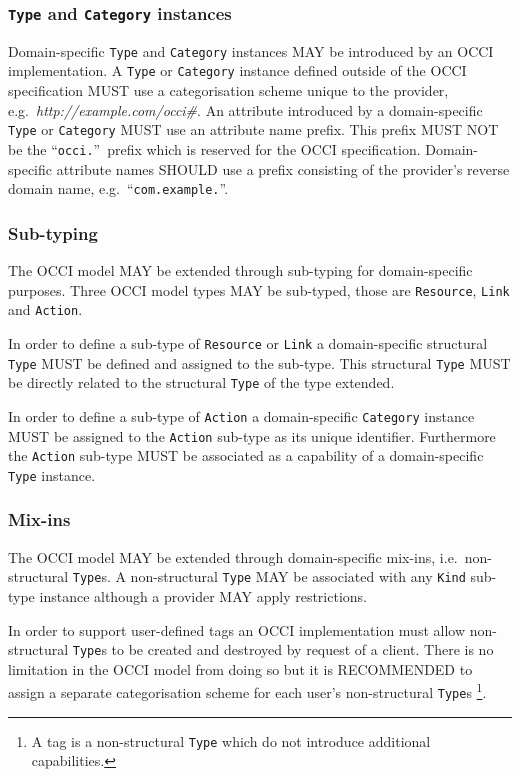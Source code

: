\documentclass[10pt,a4paper,british]{article}
\newcommand{\hl}{\texttt}
\begin{document}
\subsubsection{\hl{Type} and \hl{Category} instances}
\label{sec:ext:category}
Domain-specific \hl{Type} and \hl{Category} instances MAY be introduced by an
OCCI implementation.
%
A \hl{Type} or \hl{Category} instance defined outside of the OCCI
specification MUST use a categorisation scheme unique to the provider,
e.g.~\textit{http://example.com/occi\#}.
%
An attribute introduced by a domain-specific \hl{Type} or \hl{Category} MUST
use an attribute name prefix. This prefix MUST NOT be the ``\texttt{occi.}''~prefix
which is reserved for the OCCI specification. Domain-specific attribute names
SHOULD use a prefix consisting of the provider's reverse domain name,
e.g.~``\texttt{com.example.}''.

\subsubsection{Sub-typing}
The OCCI model MAY be extended through sub-typing for domain-specific purposes.
Three OCCI model types MAY be sub-typed, those are \hl{Resource}, \hl{Link} and
\hl{Action}.

In order to define a sub-type of \hl{Resource} or \hl{Link} a domain-specific
structural \hl{Type} MUST be defined and assigned to the sub-type. This
structural \hl{Type} MUST be directly related to the structural \hl{Type} of
the type extended.

In order to define a sub-type of \hl{Action} a domain-specific \hl{Category}
instance MUST be assigned to the \hl{Action} sub-type as its unique identifier.
Furthermore the \hl{Action} sub-type MUST be associated as a capability of a
domain-specific \hl{Type} instance.

\subsubsection{Mix-ins}
The OCCI model MAY be extended through domain-specific mix-ins,
i.e.~non-structural \hl{Type}s.  A non-structural \hl{Type} MAY be associated
with any \hl{Kind} sub-type instance although a provider MAY apply
restrictions.

In order to support user-defined tags an OCCI implementation must allow
non-structural \hl{Type}s to be created and destroyed by request of a client.
There is no limitation in the OCCI model from doing so but it is RECOMMENDED to
assign a separate categorisation scheme for each user's non-structural
\hl{Type}s%
\footnote{A tag is a non-structural \hl{Type} which do not introduce additional
capabilities.}.
\end{document}
